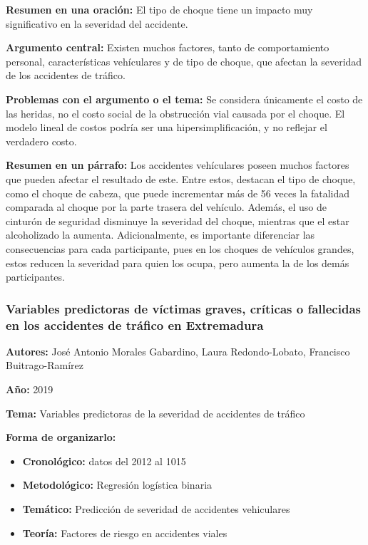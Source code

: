\documentclass{book}
\begin{document}
\textbf{Resumen en una oración:} El tipo de choque tiene un impacto muy significativo en la severidad del accidente.

\textbf{Argumento central:} Existen muchos factores, tanto de comportamiento personal, características vehículares y de tipo de choque, que afectan la severidad de los accidentes de tráfico.

\textbf{Problemas con el argumento o el tema:} Se considera únicamente el costo de las heridas, no el costo social de la obstrucción vial causada por el choque. El modelo lineal de costos podría ser una hipersimplificación, y no reflejar el verdadero costo.

\textbf{Resumen en un párrafo:} Los accidentes vehículares poseen muchos factores que pueden afectar el resultado de este. Entre estos, destacan el tipo de choque, como el choque de cabeza, que puede incrementar más de 56 veces la fatalidad comparada al choque por la parte trasera del vehículo. Además, el uso de cinturón de seguridad disminuye la severidad del choque, mientras que el estar alcoholizado la aumenta. Adicionalmente, es importante diferenciar las consecuencias para cada participante, pues en los choques de vehículos grandes, estos reducen la severidad para quien los ocupa, pero aumenta la de los demás participantes. 

\subsubsection{Variables predictoras de víctimas graves, críticas o fallecidas en los accidentes de tráfico en Extremadura}
\textbf{Autores:} José Antonio Morales Gabardino, Laura Redondo-Lobato, Francisco Buitrago-Ramírez

\textbf{Año:} 2019

\textbf{Tema:} Variables predictoras de la severidad de accidentes de tráfico

\textbf{Forma de organizarlo:}

\begin{itemize}
\setlength{\itemindent}{0.5in}
    \item \textbf{Cronológico:} datos del 2012 al 1015
    \item \textbf{Metodológico:} Regresión logística binaria
    \item \textbf{Temático:} Predicción de severidad de accidentes vehiculares
    \item \textbf{Teoría:} Factores de riesgo en accidentes viales
\end{itemize}
\end{document}
